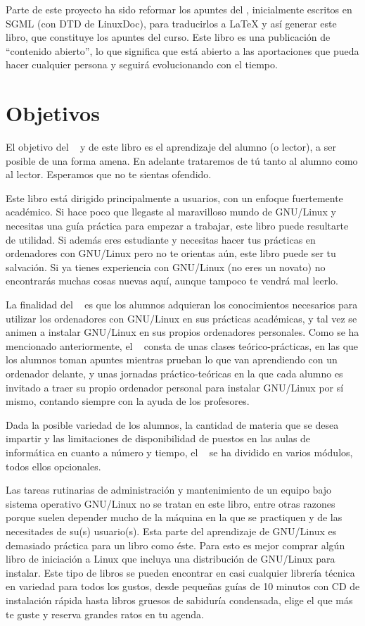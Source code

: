 Parte  de  este proyecto  ha  sido  reformar  los apuntes  del  \CILA,
inicialmente  escritos  en {\sc  SGML}  (con  DTD de  LinuxDoc),  para
traducirlos a  {\LaTeX} y así  generar este libro, que  constituye los
apuntes  del  curso. Este  libro  es  una publicación  de  ``contenido
abierto'', lo  que significa que  está abierto a las  aportaciones que
pueda hacer cualquier persona y seguirá evolucionando con el tiempo.

\section*{Objetivos}

El objetivo del \CILA~ y de este libro es el aprendizaje del alumno (o
lector), a ser  posible de una forma amena. En  adelante trataremos de
tú  tanto al  alumno  como  al lector.  Esperamos  que  no te  sientas
ofendido.

Este libro  está dirigido  principalmente a  usuarios, con  un enfoque
fuertemente académico. Si hace poco  que llegaste al maravilloso mundo
de GNU/Linux  y necesitas una  guía práctica para empezar  a trabajar,
este libro puede  resultarte de utilidad. Si además  eres estudiante y
necesitas hacer tus prácticas en  ordenadores con GNU/Linux pero no te
orientas  aún,  este  libro  puede  ser tu  salvación.  Si  ya  tienes
experiencia con  GNU/Linux (no eres  un novato) no  encontrarás muchas
cosas nuevas aquí, aunque tampoco te vendrá mal leerlo.

La finalidad del \CILA~ es que los alumnos adquieran los conocimientos
necesarios  para  utilizar  los   ordenadores  con  GNU/Linux  en  sus
prácticas académicas, y tal vez se  animen a instalar GNU/Linux en sus
propios ordenadores  personales. Como se ha  mencionado anteriormente,
el  \CILA~ consta  de unas  clases teórico-prácticas,  en las  que los
alumnos toman apuntes  mientras prueban lo que van  aprendiendo con un
ordenador delante,  y unas jornadas  práctico-teóricas en la  que cada
alumno es invitado a traer  su propio ordenador personal para instalar
GNU/Linux  por  sí  mismo,  contando  siempre  con  la  ayuda  de  los
profesores.

Dada la posible variedad de los alumnos, la cantidad de materia que se
desea impartir y las limitaciones  de disponibilidad de puestos en las
aulas de  informática en  cuanto a  número y tiempo,  el \CILA~  se ha
dividido en varios  módulos, todos ellos opcionales.  

Las tareas rutinarias  de administración y mantenimiento  de un equipo
bajo sistema  operativo GNU/Linux  no se tratan  en este  libro, entre
otras razones porque suelen depender mucho  de la máquina en la que se
practiquen y  de las necesitades  de su(s) usuario(s). Esta  parte del
aprendizaje  de GNU/Linux  es demasiado  práctica para  un libro  como
éste. Para esto es mejor comprar algún libro de iniciación a Linux que
incluya  una distribución  de GNU/Linux  para instalar.  Este tipo  de
libros  se pueden  encontrar  en casi  cualquier  librería técnica  en
variedad para todos los gustos, desde pequeñas guías de 10 minutos con
CD de instalación rápida hasta libros gruesos de sabiduría condensada,
elige el que más te guste y reserva grandes ratos en tu agenda.


